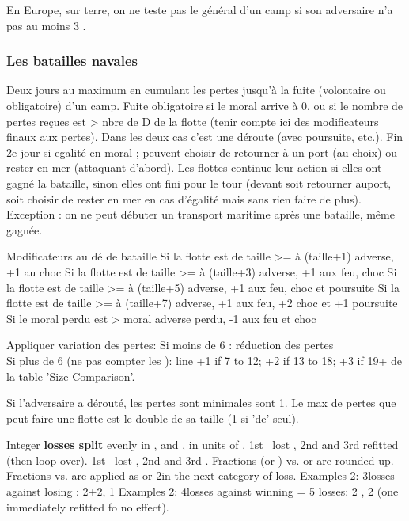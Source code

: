 En Europe, sur terre, on ne teste pas le général d'un camp si son adversaire
n'a pas au moins 3 \LD.

\subsubsection{Les batailles navales}
\aparag Deux jours au maximum en cumulant les pertes jusqu'à la fuite (volontaire
ou obligatoire) d'un camp.
\bparag Fuite obligatoire 
       si le moral arrive à 0, ou
       si le nombre de pertes reçues est > nbre de D de la flotte
               (tenir compte ici des modificateurs finaux aux pertes).
     Dans les deux cas c'est une déroute (avec poursuite, etc.).
\bparag Fin 2e jour si egalité en moral ;
peuvent choisir de retourner à un port (au choix) ou rester en mer (attaquant
d'abord). 
\bparag Les flottes continue leur action si elles ont gagné la bataille, sinon
elles ont fini pour le tour (devant soit retourner auport, soit choisir de rester en mer
en cas d'égalité mais sans rien faire de plus).
Exception : on ne peut débuter un transport maritime après une bataille, même gagnée.

 Modificateurs au dé de bataille
\bparag Si la flotte est de taille >= à (taille+1) adverse, +1 au choc
\bparag Si la flotte est de taille >= à (taille+3) adverse, +1 aux feu, choc
\bparag Si la flotte est de taille >= à (taille+5) adverse, +1 aux feu, choc et poursuite
\bparag Si la flotte est de taille >= à (taille+7) adverse, +1 aux feu,  +2 choc et +1 poursuite
\bparag Si le moral perdu est > moral adverse perdu, -1 aux feu et choc

Appliquer variation des pertes:
\bparag Si moins de 6 \ND : réduction des pertes \\ 
Si plus de 6 \ND (ne pas compter les \NDE):
line +1 if 7 to 12\DN; +2 if 13 to 18\DN; +3 if 19+\DN 
de la table 'Size Comparison'.

\bparag Si l'adversaire a dérouté, les pertes sont minimales sont 1.
\bparag Le max de pertes que peut faire une flotte est le double de sa taille
       (1 si 'de' seul).


\bparag  Integer {\bf losses split} evenly in ,  and , in units of \ND.
 1st \ND\ lost  , 2nd  and 3rd refitted (then loop over).
 1st \ND\ lost  , 2nd  and 3rd .
\bparag Fractions (\tu or \td) vs. \NGD or \NTD are  rounded up. Fractions vs. \ND are applied as \NDE or 2\NDE  in the next category of loss.
\bparag Examples 2: 3\td losses against losing \ND: 2\ND+2, 1 \bparag Examples 2: 4\tu losses against winning \NGD = 5 losses: 2  , 2  (one immediately refitted fo no effect).


